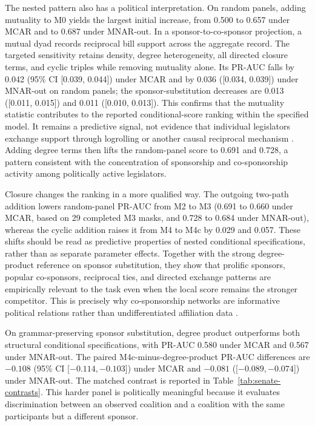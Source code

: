 \documentclass{nws}
\begin{document}
The nested pattern also has a political interpretation. On random panels, adding mutuality to M0 yields the largest initial increase, from 0.500 to 0.657 under MCAR and to 0.687 under MNAR-out. In a sponsor-to-co-sponsor projection, a mutual dyad records reciprocal bill support across the aggregate record. The targeted sensitivity retains density, degree heterogeneity, all directed closure terms, and cyclic triples while removing mutuality alone. Its PR-AUC falls by 0.042 (95\% CI [0.039, 0.044]) under MCAR and by 0.036 ([0.034, 0.039]) under MNAR-out on random panels; the sponsor-substitution decreases are 0.013 ([0.011, 0.015]) and 0.011 ([0.010, 0.013]). This confirms that the mutuality statistic contributes to the reported conditional-score ranking within the specified model. It remains a predictive signal, not evidence that individual legislators exchange support through logrolling or another causal reciprocal mechanism \citep{fowler2006,brattonRouse2011,kirkland2011}. Adding degree terms then lifts the random-panel score to 0.691 and 0.728, a pattern consistent with the concentration of sponsorship and co-sponsorship activity among politically active legislators.

Closure changes the ranking in a more qualified way. The outgoing two-path addition lowers random-panel PR-AUC from M2 to M3 (0.691 to 0.660 under MCAR, based on 29 completed M3 masks, and 0.728 to 0.684 under MNAR-out), whereas the cyclic addition raises it from M4 to M4c by 0.029 and 0.057. These shifts should be read as predictive properties of nested conditional specifications, rather than as separate parameter effects. Together with the strong degree-product reference on sponsor substitution, they show that prolific sponsors, popular co-sponsors, reciprocal ties, and directed exchange patterns are empirically relevant to the task even when the local score remains the stronger competitor. This is precisely why co-sponsorship networks are informative political relations rather than undifferentiated affiliation data \citep{fowler2006,brattonRouse2011}.

On grammar-preserving sponsor substitution, degree product outperforms both structural conditional specifications, with PR-AUC 0.580 under MCAR and 0.567 under MNAR-out. The paired M4c-minus-degree-product PR-AUC differences are $-0.108$ (95\% CI [$-0.114,-0.103$]) under MCAR and $-0.081$ ([$-0.089,-0.074$]) under MNAR-out. The matched contrast is reported in Table~\ref{tab:senate-contrasts}. This harder panel is politically meaningful because it evaluates discrimination between an observed coalition and a coalition with the same participants but a different sponsor.
\end{document}
